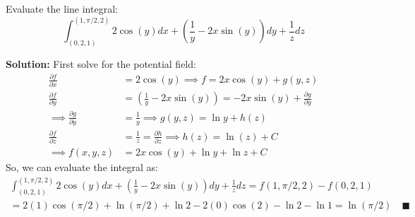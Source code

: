 \documentclass[letterpaper, 11pt]{article}
\begin{document}
\subsection{} Evaluate the line integral:
\[ \int_{(0,2,1)}^{(1,\pi/2,2)} 2 \cos(y) dx + \left( \frac{1}{y} - 2x \sin(y) \right) dy  + \frac{1}{z}dz \]
\par \textbf{Solution:} First solve for the potential field:
\begin{align*}
\frac{\partial f}{\partial x} &= 2 \cos(y) \implies f = 2x\cos(y) + g(y,z) \\
\frac{\partial f}{\partial y} &= \left( \frac{1}{y} - 2x \sin (y) \right) = -2x\sin(y) + \frac{\partial g}{\partial y} \\
\implies \frac{\partial g}{\partial y} &= \frac{1}{y} \implies g(y,z) = \ln y + h(z) \\
\frac{\partial f}{\partial z} &= \frac{1}{z} = \frac{\partial h}{\partial z} \implies h(z) = \ln(z) + C\\
\implies f(x,y,z) &=  2x\cos(y) + \ln y + \ln z + C 
\end{align*}
So, we can evaluate the integral as:
\begin{gather*}
 \int_{(0,2,1)}^{(1,\pi/2,2)} 2 \cos(y) dx + \left( \frac{1}{y} - 2x \sin(y) \right) dy  + \frac{1}{z}dz = f(1,\pi/2,2) - f(0,2,1) \\
= 2(1)\cos(\pi/2) + \ln (\pi/2) + \ln 2 - 2(0)\cos(2) - \ln 2 - \ln 1 = \ln (\pi/2)  \quad\blacksquare 
 \end{gather*}
\end{document}
